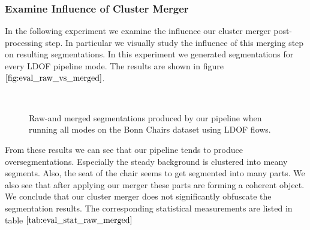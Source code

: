 \subsubsection{Examine Influence of Cluster Merger}
In the following experiment we examine the influence our cluster merger post-processing step. In particular we visually study the influence of this merging step on resulting segmentations. In this experiment we generated segmentations for every LDOF pipeline mode. The results are shown in figure $\ref{fig:eval_raw_vs_merged}$.
\begin{figure}[H]
\begin{center}
~
~
\end{center}
\caption[Bonn Chairs Segmentations Frame 30]{Raw-and merged segmentations produced by our pipeline when running all modes on the Bonn Chairs dataset using LDOF flows.}
\label{fig:eval_raw_vs_merged}
\end{figure}
From these results we can see that our pipeline tends to produce oversegmentations. Especially the steady background is clustered into meany segments. Also, the seat of the chair seems to get segmented into many parts. We also see that after applying our merger these parts are forming a coherent object. We conclude that our cluster merger does not significantly obfuscate the segmentation results. The corresponding statistical measurements are listed in table $\ref{tab:eval_stat_raw_merged}$

